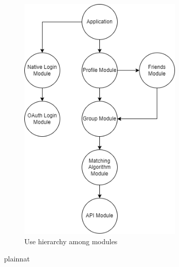 \documentclass[12pt, titlepage]{article}
\begin{document}
\begin{figure}[H]
\centering
\includegraphics[width=0.7\textwidth]{UsesHierarchy.png}
\caption{Use hierarchy among modules}
\label{FigUH}
\end{figure}

\newpage


 {plainnat}

\end{document}
